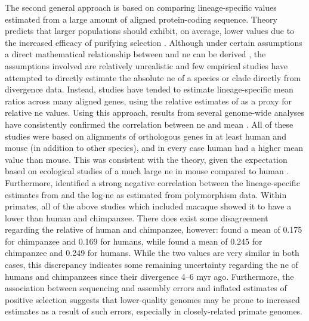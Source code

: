 The second general approach is based on comparing lineage-specific
\dnds values estimated from a large amount of aligned protein-coding
sequence. Theory predicts that larger populations should exhibit, on
average, lower \dnds values due to the increased efficacy of purifying
selection \citep{Ellegren2008}. Although under certain assumptions a
direct mathematical relationship between \dnds and \ac{ne} can be
derived \citep{Kimura1985,Nielsen2003,Kryazhimskiy2008}, the assumptions involved
are relatively unrealistic and few empirical studies have attempted to
directly estimate the absolute \ac{ne} of a species or clade directly
from divergence data. Instead, studies have tended to estimate
lineage-specific mean \dnds ratios across many aligned genes, using
the relative estimates of \dnds as a proxy for relative \ac{ne}
values. Using this approach, results from several genome-wide analyses
have consistently confirmed the correlation between \ac{ne} and mean
\dnds
\citep{LindbladToh2005Genome,Macaque2007,Sequencing2005a,Warren2008b,Kosiol2008}. All
of these studies were based on alignments of orthologous genes in at
least human and mouse (in addition to other species), and in every
case human had a higher mean \dnds value than mouse. This was
consistent with the theory, given the expectation based on ecological
studies of a much large \ac{ne} in mouse compared to human
\citep{Ellegren2008}. Furthermore, \citet{Ellegren2008} identified a
strong negative correlation between the lineage-specific \dnds
estimates from \citet{Kosiol2008} and the log-\ac{ne} as estimated
from polymorphism data. Within primates, all of the above studies
which included macaque showed it to have a lower \dnds than human and
chimpanzee. There does exist some disagreement regarding the relative
\dnds of human and chimpanzee, however: \citet{Macaque2007} found a
mean \dnds of 0.175 for chimpanzee and 0.169 for humans, while
\citet{Kosiol2008} found a mean \dnds of 0.245 for chimpanzee and
0.249 for humans. While the two values are very similar in both cases,
this discrepancy indicates some remaining uncertainty regarding the
\ac{ne} of humans and chimpanzees since their divergence 4--6 \ac{myr}
ago. Furthermore, the association between sequencing and assembly
errors and inflated estimates of positive selection
\citep{Schneider2009} suggests that lower-quality genomes may be prone
to increased \dnds estimates as a result of such errors, especially in
closely-related primate genomes.

